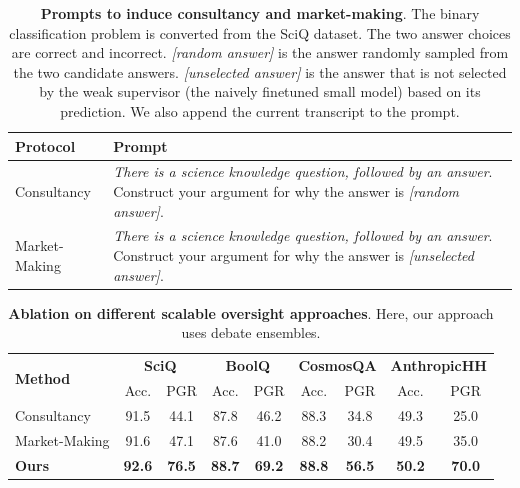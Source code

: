 \documentclass[letterpaper]{article} %
\begin{document}
\begin{table}[t]
    \centering
    \small
    \begin{tabular}{L{60pt} |  L{360pt} }
    \toprule
    \textbf{Protocol} & \textbf{Prompt} \\
    \midrule
     Consultancy   & \textit{There is a science knowledge question, followed by an answer}. Construct your argument for why the answer is \textit{[random answer]}.\\
    \midrule
     Market-Making & \textit{There is a science knowledge question, followed by an answer}. Construct your argument for why the answer is \textit{[unselected answer]}.\\
    \bottomrule
    \end{tabular}
    \caption{\textbf{Prompts to induce consultancy and market-making}. The binary classification problem is converted from the SciQ dataset. The two answer choices are correct and incorrect. \textit{[random answer]} is the answer randomly sampled from the two candidate answers. \textit{[unselected answer]} is the answer that is not selected by the weak supervisor (the naively finetuned small model) based on its prediction. We also append the current transcript to the prompt.}
    \label{tab:prompt2}
\end{table}


\begin{table}[t]
    \centering
    \small
    \begin{tabular}{l|cc|cc|cc|cc}
    \toprule
    \multicolumn{1}{l|}{\multirow{2}{*}{\textbf{Method}}} & \multicolumn{2}{c|}{\textbf{SciQ}} & \multicolumn{2}{c|}{\textbf{BoolQ}} & \multicolumn{2}{c|}{\textbf{CosmosQA}} & \multicolumn{2}{c}{\textbf{AnthropicHH}} \\
    \multicolumn{1}{l|}{} &  Acc. &  PGR &  Acc. &  PGR &  Acc. &  PGR &  Acc. &  PGR \\
    \midrule
    Consultancy & 91.5 & 44.1 & 87.8 & 46.2 & 88.3 & 34.8& 49.3 & 25.0\\
    Market-Making & 91.6 & 47.1 & 87.6 & 41.0& 88.2 & 30.4& 49.5 & 35.0\\
    \midrule
    \textbf{Ours} & \textbf{92.6} & \textbf{76.5} & \textbf{88.7} & \textbf{69.2} & \textbf{88.8} & \textbf{56.5}& \textbf{50.2} & \textbf{70.0}\\
    \bottomrule
    \end{tabular}
   \caption{\textbf{Ablation on different scalable oversight approaches}. Here, our approach uses debate ensembles.}
    \label{tab:ab_so}
\end{table}
\end{document}
